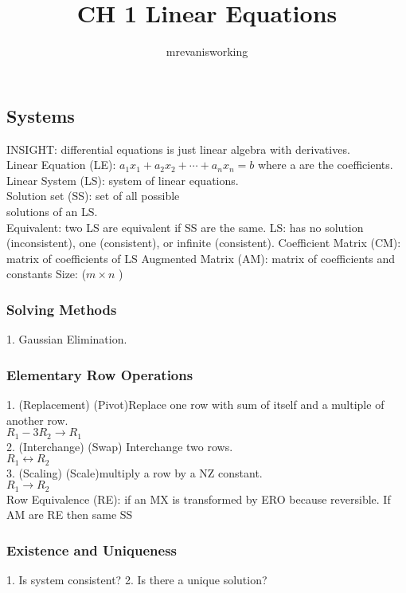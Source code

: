\documentclass[12pt]{article}
\begin{document}
\title{CH 1 Linear Equations}
\author{mrevanisworking}
\maketitle


\subsection{Systems}
INSIGHT: differential equations is just linear algebra with derivatives. \\
Linear Equation (LE): $ a_{1}x_{1} + a_{2}x_{2} + \cdots + a_{n}x_{n} = b $ where a 
    are the coefficients.
    Linear System (LS): system of linear equations. \\
    Solution set (SS): set of all possible \\
    solutions of an LS. \\
    Equivalent: two LS are equivalent if SS are the same.
    LS: has no solution (inconsistent), one (consistent), 
    or infinite (consistent).
    Coefficient Matrix (CM): matrix of coefficients of LS
    Augmented Matrix (AM): matrix of coefficients and constants
    Size: ($ m \times n $ )
    \subsubsection{Solving Methods}
   1. Gaussian Elimination.  
   \subsubsection{Elementary Row Operations}
   1. (Replacement) (Pivot)Replace one row with sum of itself and a multiple  
   of another row. \\
   $ R_{1} - 3R_{2} \rightarrow R_{1} $ \\
   2. (Interchange) (Swap) Interchange two rows. \\
   $ R_{1} \leftrightarrow R_{2} $ \\
   3. (Scaling) (Scale)multiply a row by a NZ constant. \\
   $ R_{1} \rightarrow R_{2} $ \\
   Row Equivalence (RE): if an MX is transformed by ERO because reversible.
        If AM are RE then same SS
    \subsubsection{Existence and Uniqueness}
        1. Is system consistent?
        2. Is there a unique solution?
\end{document}
